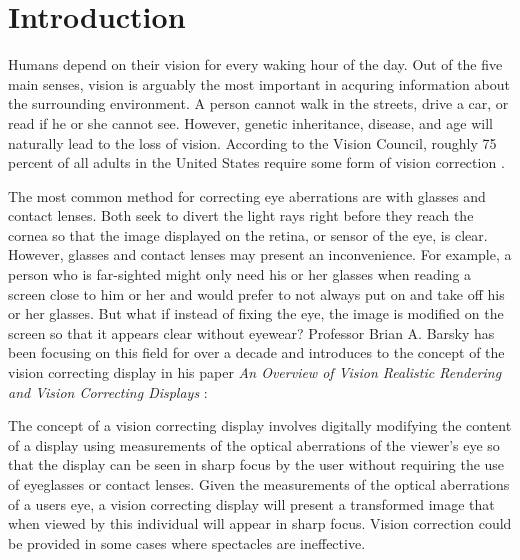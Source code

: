 \chapter{Introduction}

Humans depend on their vision for every waking hour of the day. Out of the five main senses, vision is arguably the most important in acquring information about the surrounding environment. A person cannot walk in the streets, drive a car, or read if he or she cannot see. However, genetic inheritance, disease, and age will naturally lead to the loss of vision. According to the Vision Council, roughly 75 percent of all adults in the United States require some form of vision correction \cite{GlassesCrafter.com:2010:Vision}. 

The most common method for correcting eye aberrations are with glasses and contact lenses. Both seek to divert the light rays right before they reach the cornea so that the image displayed on the retina, or sensor of the eye, is clear. However, glasses and contact lenses may present an inconvenience. For example, a person who is far-sighted might only need his or her glasses when reading a screen close to him or her and would prefer to not always put on and take off his or her glasses. But what if instead of fixing the eye, the image is modified on the screen so that it appears clear without eyewear? Professor Brian A. Barsky has been focusing on this field for over a decade and introduces to the concept of the vision correcting display in his paper \textit{An Overview of Vision Realistic Rendering and Vision Correcting Displays} \cite{SDTP:SDTP10326}:

\begin{displayquote}
The concept of a vision correcting display involves digitally modifying the content of a display using measurements of the optical aberrations of the viewer's eye so that the display can be seen in sharp focus by the user without requiring the use of eyeglasses or contact lenses. Given the measurements of the optical aberrations of a users eye, a vision correcting display will present a transformed image that when viewed by this individual will appear in sharp focus. Vision correction could be provided in some cases where spectacles are ineffective.
\end{displayquote}


